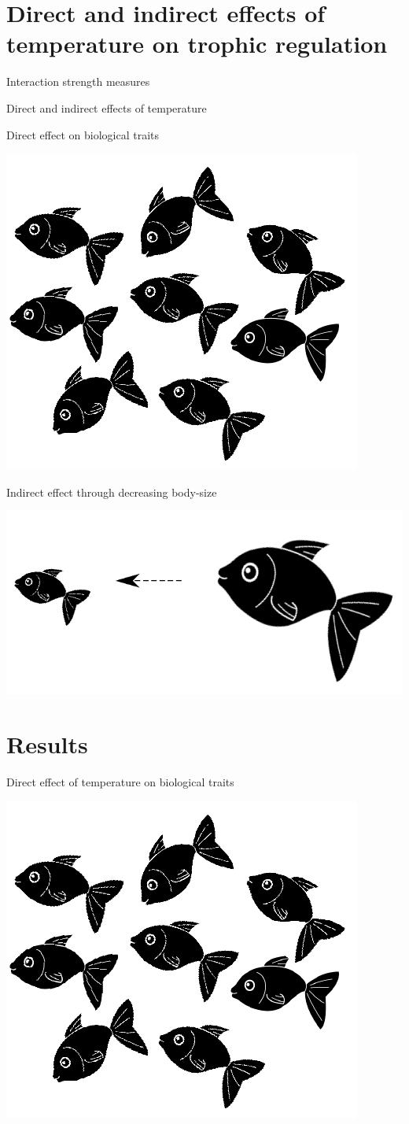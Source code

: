 \documentclass[11pt, compress, aspectratio=1610]{beamer}
\begin{document}
\section{Direct and indirect effects of temperature on trophic
regulation}\label{direct-and-indirect-effects-of-temperature-on-trophic-regulation}

\begin{frame}{Interaction strength measures}

\centering
 \par

\end{frame}

\begin{frame}{Direct and indirect effects of temperature}

Direct effect on biological traits \par
\includegraphics[width=0.2\linewidth]{figuresAz/fish_pop.pdf} \par
\vspace{1cm}

Indirect effect through decreasing body-size \par

\includegraphics[width=0.2\linewidth]{figuresAz/size.pdf}

\end{frame}

\section{Results}\label{results}

\begin{frame}{Direct effect of temperature on biological traits}

\centering
\includegraphics[width=0.4\linewidth]{figuresAz/fish_pop.pdf} \par

\end{frame}
\end{document}
